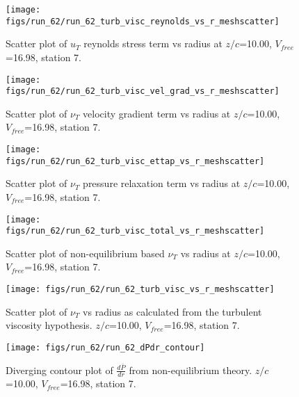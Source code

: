 \begin{figure}[H]
\centering
\texttt{[image: figs/run\_62/run\_62\_turb\_visc\_reynolds\_vs\_r\_meshscatter]}
\caption{Scatter plot of $
u_T$ reynolds stress term vs radius at $z/c$=10.00, $V_{free}$=16.98, station 7.}
\end{figure}


\begin{figure}[H]
\centering
\texttt{[image: figs/run\_62/run\_62\_turb\_visc\_vel\_grad\_vs\_r\_meshscatter]}
\caption{Scatter plot of $\nu_T$ velocity gradient term vs radius at $z/c$=10.00, $V_{free}$=16.98, station 7.}
\end{figure}


\begin{figure}[H]
\centering
\texttt{[image: figs/run\_62/run\_62\_turb\_visc\_ettap\_vs\_r\_meshscatter]}
\caption{Scatter plot of $\nu_T$ pressure relaxation term vs radius at $z/c$=10.00, $V_{free}$=16.98, station 7.}
\end{figure}


\begin{figure}[H]
\centering
\texttt{[image: figs/run\_62/run\_62\_turb\_visc\_total\_vs\_r\_meshscatter]}
\caption{Scatter plot of non-equilibrium based $\nu_T$ vs radius at $z/c$=10.00, $V_{free}$=16.98, station 7.}
\end{figure}


\begin{figure}[H]
\centering
\texttt{[image: figs/run\_62/run\_62\_turb\_visc\_vs\_r\_meshscatter]}
\caption{Scatter plot of $\nu_T$ vs radius as calculated from the turbulent viscosity hypothesis. $z/c$=10.00, $V_{free}$=16.98, station 7.}
\end{figure}


\begin{figure}[H]
\centering
\texttt{[image: figs/run\_62/run\_62\_dPdr\_contour]}
\caption{Diverging contour plot of $\frac{d\bar{P}}{dr}$ from non-equilibrium theory. $z/c$=10.00, $V_{free}$=16.98, station 7.}
\end{figure}


